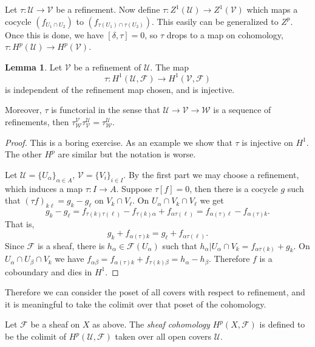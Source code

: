 \documentclass[12pt]{book}
\newcommand{\dfn}[1]{\emph{#1}\index{#1}}
\theoremstyle{definition}
\newtheorem{lemma}[theorem]{Lemma}
\newenvironment{definition}
  {\pushQED{\qed}\renewcommand{\qedsymbol}{$\diamondsuit$}\definitionx}
  {\popQED\endexamplex}
\begin{document}
Let $\tau: \mathcal U \to \mathcal V$ be a refinement.
Now define $\tau: Z^1(\mathcal U) \to Z^1(\mathcal V)$ which maps a cocycle $(f_{U_1\cap U_2})$ to $(f_{\tau(U_1) \cap \tau(U_2)})$.
This easily can be generalized to $Z^p$.
Once this is done, we have $[\delta, \tau] = 0$, so $\tau$ drops to a map on cohomology, $\tau: H^p(\mathcal U) \to H^p(\mathcal V)$.

\begin{lemma}
Let $\mathcal V$ be a refinement of $\mathcal U$.
The map
$$\tau: H^1(\mathcal U, \mathscr F) \to H^1(\mathcal V, \mathscr F)$$
is independent of the refinement map chosen, and is injective.

Moreover, $\tau$ is functorial in the sense that $\mathcal U \to \mathcal V \to \mathcal W$ is a sequence of refinements, then $\tau_{\mathcal W}^{\mathcal V} \tau_{\mathcal V}^{\mathcal U} = \tau_{\mathcal W}^{\mathcal U}$.
\end{lemma}
\begin{proof}
This is a boring exercise.
As an example we show that $\tau$ is injective on $H^1$.
The other $H^p$ are similar but the notation is worse.

Let $\mathcal U = \{U_\alpha\}_{\alpha \in A}$, $\mathcal V = \{V_i\}_{i \in I}$.
By the first part we may choose a refinement, which induces a map $\tau: I \to A$.
Suppose $\tau[f] = 0$, then there is a cocycle $g$ such that $(\tau f)_{k \ell} = g_k - g_\ell$ on $V_k \cap V_\ell$.
On $U_\alpha \cap V_k \cap V_\ell$ we get
$$g_k - g_\ell = f_{\tau(k) \tau(\ell)} - f_{\tau(k)\alpha} + f_{\alpha \tau(\ell)} = f_{\alpha(\tau) \ell} - f_{\alpha(\tau) k}.$$
That is,
$$g_k + f_{\alpha(\tau) k} = g_\ell + f_{\alpha \tau(\ell)}.$$
Since $\mathscr F$ is a sheaf, there is $h_\alpha \in \mathscr F(U_\alpha)$ such that $h_\alpha|U_\alpha \cap V_k = f_{\alpha \tau(k)} + g_k$.
On $U_\alpha \cap U_\beta \cap V_k$ we have $f_{\alpha \beta} = f_{\alpha(\tau) k} + f_{\tau(k) \beta} = h_\alpha - h_\beta$.
Therefore $f$ is a coboundary and dies in $H^1$.
\end{proof}

Therefore we can consider the poset of all covers with respect to refinement, and it is meaningful to take the colimit over that poset of the cohomology.

\begin{definition}
Let $\mathscr F$ be a sheaf on $X$ as above.
The \dfn{sheaf cohomology} $H^p(X, \mathscr F)$ is defined to be the colimit of $H^p(\mathcal U, \mathscr F)$ taken over all open covers $\mathcal U$.
\end{definition}
\end{document}
